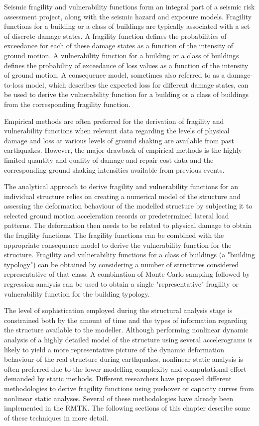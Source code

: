 Seismic fragility and vulnerability functions form an integral part of a seismic risk assessment project, along with the seismic hazard and exposure models. Fragility functions for a building or a class of buildings are typically associated with a set of discrete damage states. A fragility function defines the probabilities of exceedance for each of these damage states as a function of the intensity of ground motion. A vulnerability function for a building or a class of buildings defines the probability of exceedance of loss values as a function of the intensity of ground motion. A consequence model, sometimes also referred to as a damage-to-loss model, which describes the expected loss for different damage states, can be used to derive the vulnerability function for a building or a class of buildings from the corresponding fragility function.

Empirical methods are often preferred for the derivation of fragility and vulnerability functions when relevant data regarding the levels of physical damage and loss at various levels of ground shaking are available from past earthquakes. However, the major drawback of empirical methods is the highly limited quantity and quality of damage and repair cost data and the corresponding ground shaking intensities available from previous events.

The analytical approach to derive fragility and vulnerability functions for an individual structure relies on creating a numerical model of the structure and assessing the deformation behaviour of the modelled structure by subjecting it to selected ground motion acceleration records or predetermined lateral load patterns. The deformation then needs to be related to physical damage to obtain the fragility functions. The fragility functions can be combined with the appropriate consequence model to derive the vulnerability function for the structure. Fragility and vulnerability functions for a class of buildings (a "building typology") can be obtained by considering a number of structures considered representative of that class. A combination of Monte Carlo sampling followed by regression analysis can be used to obtain a single "representative" fragility or vulnerability function for the building typology.

The level of sophistication employed during the structural analysis stage is constrained both by the amount of time and the types of information regarding the structure available to the modeller. Although performing nonlinear dynamic analysis of a highly detailed model of the structure using several accelerograms is likely to yield a more representative picture of the dynamic deformation behaviour of the real structure during earthquakes, nonlinear static analysis is often preferred due to the lower modelling complexity and computational effort demanded by static methods. Different researchers have proposed different methodologies to derive fragility functions using pushover or capacity curves from nonlinear static analyses. Several of these methodologies have already been implemented in the RMTK. The following sections of this chapter describe some of these techniques in more detail.